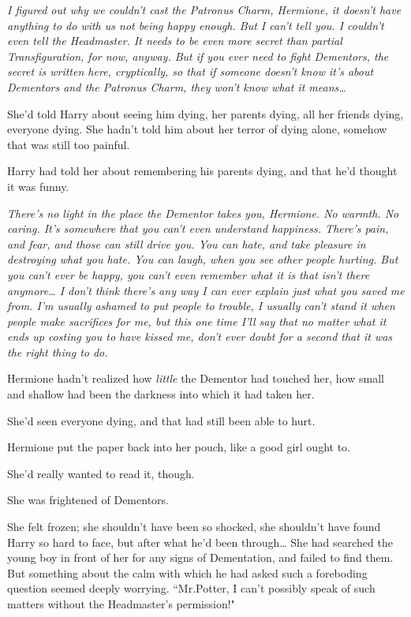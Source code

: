 \emph{I figured out why we couldn't cast the Patronus Charm, Hermione, it doesn't have anything to do with us not being happy enough. But I can't tell you. I couldn't even tell the Headmaster. It needs to be even more secret than partial Transfiguration, for now, anyway. But if you ever need to fight Dementors, the secret is written here, cryptically, so that if someone doesn't know it's about Dementors and the Patronus Charm, they won't know what it means{\ldots}}

She'd told Harry about seeing him dying, her parents dying, all her friends dying, everyone dying. She hadn't told him about her terror of dying alone, somehow that was still too painful.

Harry had told her about remembering his parents dying, and that he'd thought it was funny.

\emph{There's no light in the place the Dementor takes you, Hermione. No warmth. No caring. It's somewhere that you can't even understand happiness. There's pain, and fear, and those can still drive you. You can hate, and take pleasure in destroying what you hate. You can laugh, when you see other people hurting. But you can't ever be happy, you can't even remember what it is that isn't there anymore{\ldots} I don't think there's any way I can ever explain just what you saved me from. I'm usually ashamed to put people to trouble, I usually can't stand it when people make sacrifices for me, but this one time I'll say that no matter what it ends up costing you to have kissed me, don't ever doubt for a second that it was the right thing to do.}

Hermione hadn't realized how \emph{little} the Dementor had touched her, how small and shallow had been the darkness into which it had taken her.

She'd seen everyone dying, and that had still been able to hurt.

Hermione put the paper back into her pouch, like a good girl ought to.

She'd really wanted to read it, though.

She was frightened of Dementors.


She felt frozen; she shouldn't have been so shocked, she shouldn't have found Harry so hard to face, but after what he'd been through{\ldots} She had searched the young boy in front of her for any signs of Dementation, and failed to find them. But something about the calm with which he had asked such a foreboding question seemed deeply worrying. ``Mr.\?Potter, I can't possibly speak of such matters without the Headmaster's permission!"

